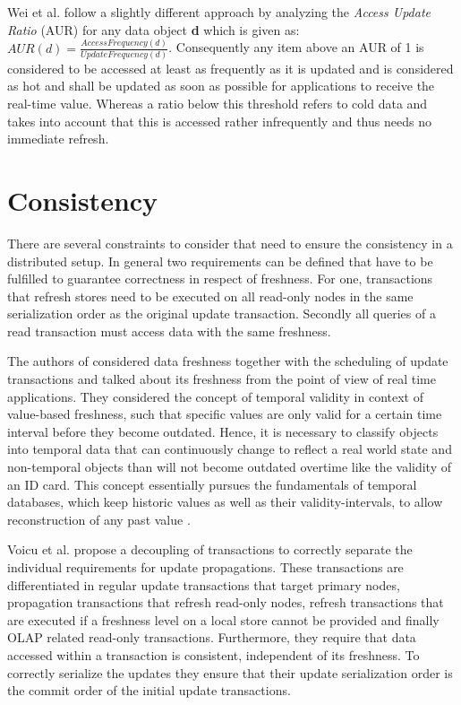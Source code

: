 Wei et al. \cite{wei:2004} follow a slightly different approach by analyzing the \emph{Access Update Ratio} (AUR) for any data object \textbf{d} which is given as: 
$AUR(d) = \frac{AccessFrequency(d)}{UpdateFrequency(d)}$. Consequently any item above an AUR of 1 is considered to be accessed at least as frequently as it is updated
and is considered as hot and shall be updated as soon as possible for applications to receive the real-time value. 
Whereas a ratio below this threshold refers to cold data and takes into account that this is accessed rather infrequently and thus needs no immediate refresh. 







\section{Consistency}
There are several constraints to consider that need to ensure the consistency in a distributed setup. In general two requirements can be defined that have to be fulfilled to
guarantee correctness in respect of freshness. For one, transactions that refresh stores need to be executed on all read-only nodes in the same serialization order as the 
original update transaction. Secondly all queries of a read transaction must access data with the same freshness.


The authors of \cite{xiang:2008}\cite{wei:2004} considered data freshness together with the scheduling of update transactions and talked about its freshness from the 
point of view of real time applications. They considered the concept of temporal validity in context of value-based freshness,
such that specific values are only valid for a certain time interval before they become outdated. Hence, it is necessary to classify objects into
temporal data that can continuously change to reflect a real world state and non-temporal objects than will not become outdated overtime like the validity of an ID card.
This concept essentially pursues the fundamentals of temporal databases, which keep historic values as well as their validity-intervals, to allow reconstruction of any 
past value \cite{etzion:1998}. 

Voicu et al. \cite{voicu:2010} propose a decoupling of transactions to correctly separate the individual requirements for update propagations.
These transactions are differentiated in regular update transactions that target primary nodes, propagation transactions that refresh read-only nodes, 
refresh transactions that are executed if a freshness level on a local store cannot be provided and finally OLAP related read-only transactions.
Furthermore, they require that data accessed within a transaction is consistent, independent of its freshness. To correctly serialize the updates
they ensure that their update serialization order is the commit order of the initial update transactions.

